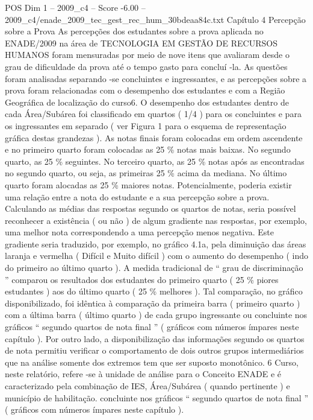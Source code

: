 \begin{textsample}{POS Dim 1 – 2009\_c4 – Score -6.00 – 2009\_c4/enade\_2009\_tec\_gest\_rec\_hum\_30bdeaa84c.txt}  \label{ex:f1_pos_412}
Capítulo 4 Percepção sobre a Prova As percepções dos estudantes sobre a prova aplicada no ENADE/2009 na área de TECNOLOGIA EM GESTÃO DE RECURSOS HUMANOS foram mensuradas por meio de nove itens que avaliaram desde o grau de dificuldade da prova até o tempo gasto para concluí -la.
As questões foram analisadas separando -se concluintes e ingressantes, e as percepções sobre a prova foram relacionadas com o desempenho dos estudantes e com a Região Geográfica de localização do curso6.
O desempenho dos estudantes dentro de cada Área/Subárea foi classificado em quartos ( 1/4 ) para os concluintes e para os ingressantes em separado ( ver Figura 1 para o esquema de representação gráfica destas grandezas ).
As notas finais foram colocadas em ordem ascendente e no primeiro quarto foram colocadas as 25 \% notas mais baixas.
No segundo quarto, as 25 \% seguintes.
No terceiro quarto, as 25 \% notas após as encontradas no segundo quarto, ou seja, as primeiras 25 \% acima da mediana.
No último quarto foram alocadas as 25 \% maiores notas.
Potencialmente, poderia existir uma relação entre a nota do estudante e a sua percepção sobre a prova.
Calculando as médias das respostas segundo os quartos de notas, seria possível reconhecer a existência ( ou não ) de algum gradiente nas respostas, por exemplo, uma melhor nota correspondendo a uma percepção menos negativa.
Este gradiente seria traduzido, por exemplo, no gráfico 4.1a, pela diminuição das áreas laranja e vermelha ( Difícil e Muito difícil ) com o aumento do desempenho ( indo do primeiro ao último quarto ).
A medida tradicional de “ grau de discriminação ” comparou os resultados dos estudantes do primeiro quarto ( 25 \% piores estudantes ) aos do último quarto ( 25 \% melhores ).
Tal comparação, no gráfico disponibilizado, foi idêntica à comparação da primeira barra ( primeiro quarto ) com a última barra ( último quarto ) de cada grupo ingressante ou concluinte nos gráficos “ segundo quartos de nota final ” ( gráficos com números ímpares neste capítulo ).
Por outro lado, a disponibilização das informações segundo os quartos de nota permitiu verificar o comportamento de dois outros grupos intermediários que na análise somente dos extremos tem que ser suposto monotônico. 6 Curso, neste relatório, refere -se à unidade de análise para o Conceito ENADE e é caracterizado pela combinação de IES, Área/Subárea ( quando pertinente ) e município de habilitação. concluinte nos gráficos “ segundo quartos de nota final ” ( gráficos com números ímpares neste capítulo ).

\end{textsample}
